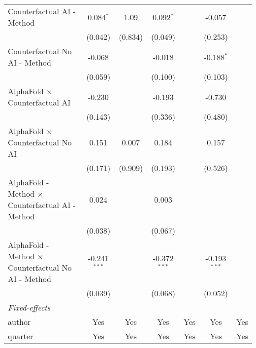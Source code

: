 \begin{tabular}{lcccccc}
   Counterfactual AI - Method                                 & 0.084$^{*}$    & 1.09    & 0.092$^{*}$    &             & -0.057         &   \\   
                                                              & (0.042)        & (0.834) & (0.049)        &             & (0.253)        &   \\   
   Counterfactual No AI - Method                              & -0.068         &         & -0.018         &             & -0.188$^{*}$   &   \\   
                                                              & (0.059)        &         & (0.100)        &             & (0.103)        &   \\   
   AlphaFold $\times$ Counterfactual AI                       & -0.230         &         & -0.193         &             & -0.730         &   \\   
                                                              & (0.143)        &         & (0.336)        &             & (0.480)        &   \\   
   AlphaFold $\times$ Counterfactual No AI                    & 0.151          & 0.007   & 0.184          &             & 0.157          &   \\   
                                                              & (0.171)        & (0.909) & (0.193)        &             & (0.526)        &   \\   
   AlphaFold - Method $\times$ Counterfactual AI - Method     & 0.024          &         & 0.003          &             &                &   \\   
                                                              & (0.038)        &         & (0.067)        &             &                &   \\   
   AlphaFold - Method $\times$ Counterfactual No AI - Method  & -0.241$^{***}$ &         & -0.372$^{***}$ &             & -0.193$^{***}$ &   \\   
                                                              & (0.039)        &         & (0.068)        &             & (0.052)        &   \\   
   \midrule
   \emph{Fixed-effects}\\
   author                                                     & Yes            & Yes     & Yes            & Yes         & Yes            & Yes\\  
   quarter                                                    & Yes            & Yes     & Yes            & Yes         & Yes            & Yes\\  

\end{tabular}

